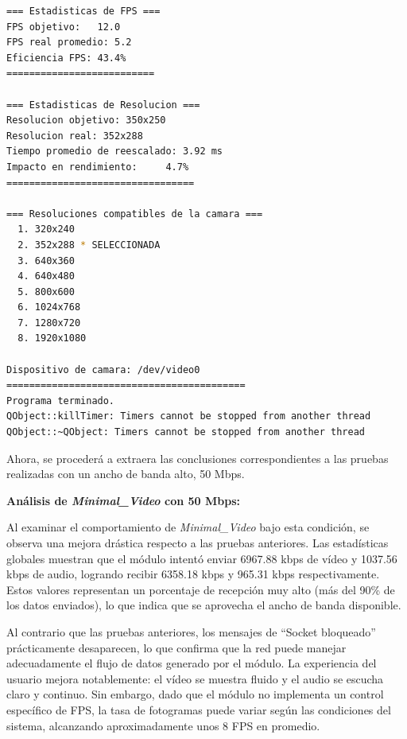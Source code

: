 \begin{lstlisting}[language=bash,basicstyle=\ttfamily\scriptsize]
=== Estadisticas de FPS ===
FPS objetivo: 	12.0
FPS real promedio: 5.2
Eficiencia FPS:	43.4%
==========================

=== Estadisticas de Resolucion ===
Resolucion objetivo: 350x250
Resolucion real: 352x288
Tiempo promedio de reescalado: 3.92 ms
Impacto en rendimiento:    	4.7%
=================================

=== Resoluciones compatibles de la camara ===
  1. 320x240
  2. 352x288 * SELECCIONADA
  3. 640x360
  4. 640x480
  5. 800x600
  6. 1024x768
  7. 1280x720
  8. 1920x1080

Dispositivo de camara: /dev/video0
==========================================
Programa terminado.
QObject::killTimer: Timers cannot be stopped from another thread
QObject::~QObject: Timers cannot be stopped from another thread
\end{lstlisting}
\vspace{\baselineskip}

\newpage

Ahora, se procederá a extraera las conclusiones correspondientes a las pruebas realizadas con un ancho de banda alto, 50 Mbps.
\vspace{\baselineskip}

\textbf{Análisis de \textit{Minimal\_Video} con 50 Mbps:}
\vspace{\baselineskip}

Al examinar el comportamiento de \textit{Minimal\_Video} bajo esta condición, se observa una mejora drástica respecto a las pruebas anteriores. Las estadísticas globales muestran que el módulo intentó enviar 6967.88 kbps de vídeo y 1037.56 kbps de audio, logrando recibir 6358.18 kbps y 965.31 kbps respectivamente. Estos valores representan un porcentaje de recepción muy alto (más del 90\% de los datos enviados), lo que indica que se aprovecha el ancho de banda disponible.
\vspace{\baselineskip}

Al contrario que las pruebas anteriores, los mensajes de ``Socket bloqueado'' prácticamente desaparecen, lo que confirma que la red puede manejar adecuadamente el flujo de datos generado por el módulo. La experiencia del usuario mejora notablemente: el vídeo se muestra fluido y el audio se escucha claro y continuo. Sin embargo, dado que el módulo no implementa un control específico de FPS, la tasa de fotogramas puede variar según las condiciones del sistema, alcanzando aproximadamente unos 8 FPS en promedio.

\vspace{\baselineskip}

